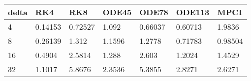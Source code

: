 \begin{tabular}{lllllll}
delta & RK4 & RK8 & ODE45 & ODE78 & ODE113 & MPCI \\ 
\hline 
4 & 0.14153 & 0.72527 & 1.092 & 0.66037 & 0.60713 & 1.9836 \\ 
8 & 0.26139 & 1.312 & 1.1596 & 1.2778 & 0.71783 & 0.98504 \\ 
16 & 0.4904 & 2.5814 & 1.288 & 2.603 & 1.2024 & 1.4529 \\ 
32 & 1.1017 & 5.8676 & 2.3536 & 5.3855 & 2.8271 & 2.6271 \\ 
\hline 
\end{tabular}